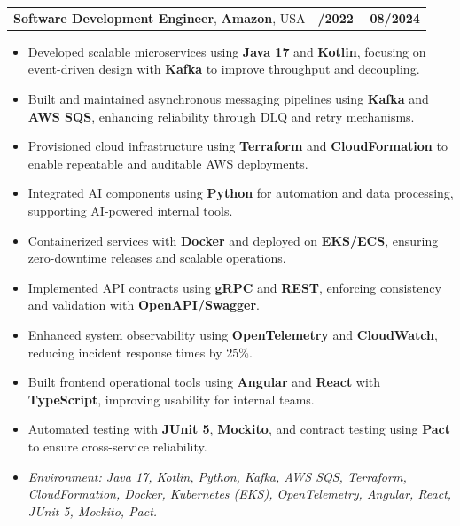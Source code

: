 \documentclass[letterpaper,11pt]{article}
\makeatletter
\newcommand{\resumeItem}[1]{
  \item\footnotesize{
    {#1 \vspace{-2pt}}
  }
}
\newcommand{\resumeSubheading}[4]{
  \vspace{-2pt}\item
    \begin{tabular*}{1.0\textwidth}[t]{l@{\extracolsep{\fill}}r}
      \textbf{\fontsize{10pt}{14pt}\selectfont #3}, \textbf{\fontsize{10pt}{14pt}\selectfont #1}, \fontsize{10pt}{14pt}\selectfont #4 & \textbf{\fontsize{10pt}{14pt}\selectfont #2} \\
    \end{tabular*}\vspace{-7pt}
}
\newcommand{\resumeItemListStart}{\begin{itemize}[leftmargin=*]}
\newcommand{\resumeItemListEnd}{\end{itemize}\vspace{-5pt}}
\makeatother
\begin{document}
\resumeSubheading
{Amazon}{10/2022 -- 08/2024}
{Software Development Engineer}{USA}
\resumeItemListStart
  \resumeItem{Developed scalable microservices using \textbf{Java 17} and \textbf{Kotlin}, focusing on event-driven design with \textbf{Kafka} to improve throughput and decoupling.}
  \resumeItem{Built and maintained asynchronous messaging pipelines using \textbf{Kafka} and \textbf{AWS SQS}, enhancing reliability through DLQ and retry mechanisms.}
  \resumeItem{Provisioned cloud infrastructure using \textbf{Terraform} and \textbf{CloudFormation} to enable repeatable and auditable AWS deployments.}
  \resumeItem{Integrated AI components using \textbf{Python} for automation and data processing, supporting AI-powered internal tools.}
  \resumeItem{Containerized services with \textbf{Docker} and deployed on \textbf{EKS/ECS}, ensuring zero-downtime releases and scalable operations.}
  \resumeItem{Implemented API contracts using \textbf{gRPC} and \textbf{REST}, enforcing consistency and validation with \textbf{OpenAPI/Swagger}.}
  \resumeItem{Enhanced system observability using \textbf{OpenTelemetry} and \textbf{CloudWatch}, reducing incident response times by 25\%.}
  \resumeItem{Built frontend operational tools using \textbf{Angular} and \textbf{React} with \textbf{TypeScript}, improving usability for internal teams.}
  \resumeItem{Automated testing with \textbf{JUnit 5}, \textbf{Mockito}, and contract testing using \textbf{Pact} to ensure cross-service reliability.}
  \resumeItem{\textit{Environment: Java 17, Kotlin, Python, Kafka, AWS SQS, Terraform, CloudFormation, Docker, Kubernetes (EKS), OpenTelemetry, Angular, React, JUnit 5, Mockito, Pact.}}
\resumeItemListEnd
\end{document}
